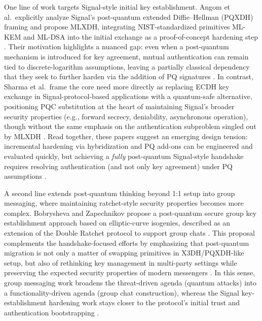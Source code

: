 One line of work targets Signal-style initial key establishment. Angom et al.\ explicitly analyze Signal’s post-quantum extended Diffie--Hellman (PQXDH) framing and propose MLXDH, integrating NIST-standardized primitives ML-KEM and ML-DSA into the initial exchange as a proof-of-concept hardening step \cite{angom2025}. Their motivation highlights a nuanced gap: even when a post-quantum mechanism is introduced for key agreement, mutual authentication can remain tied to discrete-logarithm assumptions, leaving a partially classical dependency that they seek to further harden via the addition of PQ signatures \cite{angom2025}. In contrast, Sharma et al.\ frame the core need more directly as replacing ECDH key exchange in Signal-protocol-based applications with a quantum-safe alternative, positioning PQC substitution at the heart of maintaining Signal’s broader security properties (e.g., forward secrecy, deniability, asynchronous operation), though without the same emphasis on the authentication subproblem singled out by MLXDH \cite{sharma2023}. Read together, these papers suggest an emerging design tension: incremental hardening via hybridization and PQ add-ons can be engineered and evaluated quickly, but achieving a \emph{fully} post-quantum Signal-style handshake requires resolving authentication (and not only key agreement) under PQ assumptions \cite{angom2025,sharma2023}.

A second line extends post-quantum thinking beyond 1:1 setup into group messaging, where maintaining ratchet-style security properties becomes more complex. Bobrysheva and Zapechnikov propose a post-quantum secure group key establishment approach based on elliptic-curve isogenies, described as an extension of the Double Ratchet protocol to support group chats \cite{bobrysheva2021}. This proposal complements the handshake-focused efforts by emphasizing that post-quantum migration is not only a matter of swapping primitives in X3DH/PQXDH-like setup, but also of rethinking key management in multi-party settings while preserving the expected security properties of modern messengers \cite{bobrysheva2021}. In this sense, group messaging work broadens the threat-driven agenda (quantum attacks) into a functionality-driven agenda (group chat construction), whereas the Signal key-establishment hardening work stays closer to the protocol’s initial trust and authentication bootstrapping \cite{bobrysheva2021,angom2025}.

